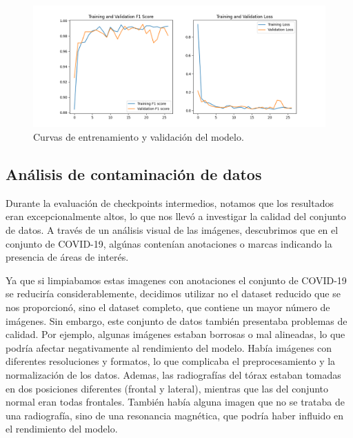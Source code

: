 \documentclass[es]{uc3mreport}
\begin{document}
\begin{report}
    \begin{centering}
    \begin{figure}[H]
        \centering
        \includegraphics[width=1\textwidth]{training_history.png}
        \caption{Curvas de entrenamiento y validación del modelo.}
        \label{fig:training}
    \end{figure}
    \end{centering}

    \subsection{Análisis de contaminación de datos}
    
    Durante la evaluación de checkpoints intermedios, notamos que los resultados eran excepcionalmente altos, lo que nos llevó a investigar la calidad del conjunto de datos. A través de un análisis visual de las imágenes, descubrimos que en el conjunto de COVID-19, algúnas contenían anotaciones o marcas indicando la presencia de áreas de interés. 
    
    Ya que si limpiabamos estas imagenes con anotaciones el conjunto de COVID-19 se reduciría considerablemente, decidimos utilizar no el dataset reducido que se nos proporcionó, sino el dataset completo, que contiene un mayor número de imágenes. Sin embargo, este conjunto de datos también presentaba problemas de calidad. Por ejemplo, algunas imágenes estaban borrosas o mal alineadas, lo que podría afectar negativamente al rendimiento del modelo. Había imágenes con diferentes resoluciones y formatos, lo que complicaba el preprocesamiento y la normalización de los datos.
    Ademas, las radiografías del tórax estaban tomadas en dos posiciones diferentes (frontal y lateral), mientras que las del conjunto normal eran todas frontales. También había alguna imagen que no se trataba de una radiografía, sino de una resonancia magnética, que podría haber influido en el rendimiento del modelo.


\end{report}
\end{document}
